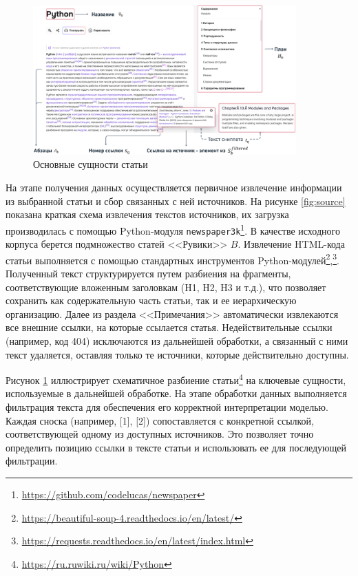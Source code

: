 \documentclass{article}
\begin{document}
\begin{figure}[ht!]
  \centering
  \includegraphics[width=0.9\textwidth]{figures/article_entities.png}
  \caption{Основные сущности статьи}
  \label{fig:article}
\end{figure}

На этапе получения данных осуществляется первичное извлечение информации из выбранной статьи и сбор связанных с ней источников. На рисунке \ref{fig:source} показана краткая схема извлечения текстов источников, 
их загрузка производилась с помощью Python-модуля \texttt{newspaper3k}\footnote{\url{https://github.com/codelucas/newspaper}}.
В качестве исходного корпуса берется подмножество статей <<Рувики>> \(B\).
Извлечение HTML-кода статьи выполняется с помощью стандартных инструментов Python-модулей\footnote{\url{https://beautiful-soup-4.readthedocs.io/en/latest/}},\footnote{\url{https://requests.readthedocs.io/en/latest/index.html}}. 
Полученный текст структурируется путем разбиения на фрагменты, соответствующие вложенным заголовкам (H1, H2, H3 и т.д.), что позволяет сохранить как содержательную часть статьи, так и ее иерархическую организацию. 
Далее из раздела <<Примечания>> автоматически извлекаются все внешние ссылки, на которые ссылается статья. Недействительные ссылки (например, код 404) исключаются из дальнейшей обработки,
а связанный с ними текст удаляется, оставляя только те источники, которые действительно доступны.

Рисунок \ref{fig:article} иллюстрирует схематичное разбиение статьи\footnote{\url{https://ru.ruwiki.ru/wiki/Python}} на ключевые сущности, используемые в дальнейшей обработке.
На этапе обработки данных выполняется фильтрация текста для обеспечения его корректной интерпретации моделью. 
Каждая сноска (например, [1], [2]) сопоставляется с конкретной ссылкой, соответствующей одному из доступных источников. 
Это позволяет точно определить позицию ссылки в тексте статьи и использовать ее для последующей фильтрации. 
\end{document}

